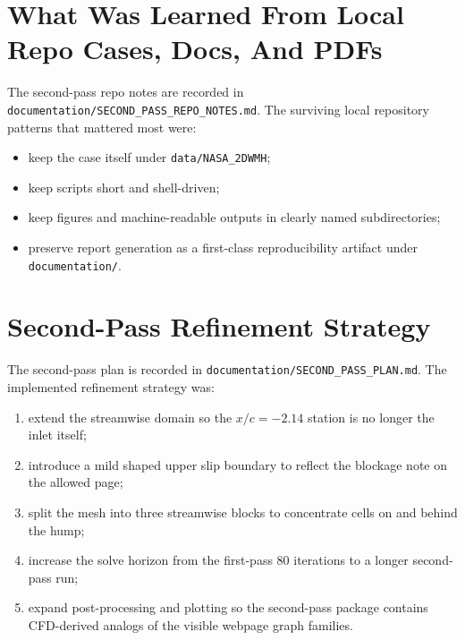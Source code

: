 \documentclass[11pt]{article}
\begin{document}
\section{What Was Learned From Local Repo Cases, Docs, And PDFs}
The second-pass repo notes are recorded in \texttt{documentation/SECOND\_PASS\_REPO\_NOTES.md}. The surviving local repository patterns that mattered most were:
\begin{itemize}
\item keep the case itself under \texttt{data/NASA\_2DWMH};
\item keep scripts short and shell-driven;
\item keep figures and machine-readable outputs in clearly named subdirectories;
\item preserve report generation as a first-class reproducibility artifact under \texttt{documentation/}.
\end{itemize}

\section{Second-Pass Refinement Strategy}
The second-pass plan is recorded in \texttt{documentation/SECOND\_PASS\_PLAN.md}. The implemented refinement strategy was:
\begin{enumerate}
\item extend the streamwise domain so the \(x/c=-2.14\) station is no longer the inlet itself;
\item introduce a mild shaped upper slip boundary to reflect the blockage note on the allowed page;
\item split the mesh into three streamwise blocks to concentrate cells on and behind the hump;
\item increase the solve horizon from the first-pass 80 iterations to a longer second-pass run;
\item expand post-processing and plotting so the second-pass package contains CFD-derived analogs of the visible webpage graph families.
\end{enumerate}
\end{document}
